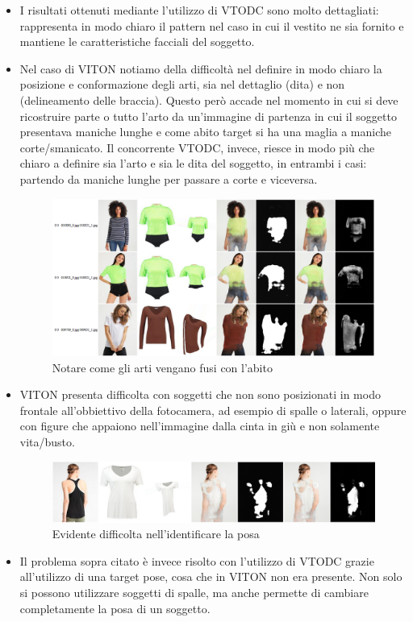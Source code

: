 \documentclass[final, 11pt]{article}
\begin{document}
	\begin{itemize}
		\item I risultati ottenuti mediante l'utilizzo di VTODC sono molto dettagliati: rappresenta in modo chiaro il pattern nel caso in cui il vestito ne sia fornito e mantiene le caratteristiche facciali del soggetto.
		\item 	Nel caso di VITON notiamo della difficoltà nel definire in modo chiaro la posizione e conformazione degli arti, sia nel dettaglio (dita) e non (delineamento delle braccia). Questo però accade nel momento in cui si deve ricostruire parte o tutto l’arto da un’immagine di partenza in cui il soggetto presentava maniche lunghe e come abito target si ha una maglia a maniche corte/smanicato.
		Il concorrente VTODC, invece, riesce in modo più che chiaro a definire sia l’arto e sia le dita del soggetto, in entrambi i casi: partendo da maniche lunghe per passare a corte e viceversa.
		\begin{figure}[!htb]
			\centering
			\includegraphics[width=\linewidth]{viton_err_2.png}
			\caption{Notare come gli arti vengano fusi con l'abito}
		\end{figure} 
		\item	VITON presenta difficolta con soggetti che non sono posizionati in modo frontale all’obbiettivo della fotocamera, ad esempio di spalle o laterali, oppure con figure che appaiono nell’immagine dalla cinta in giù e non solamente vita/busto. 
		
		\begin{figure}[!htb]
			\centering
			\includegraphics[width=\linewidth]{spalleviton.png}
			\caption{Evidente difficolta nell'identificare la posa}
		\end{figure} 
		\item	Il problema sopra citato è invece risolto con l’utilizzo di VTODC grazie all’utilizzo di una target pose, cosa che in VITON non era presente.
		Non solo si possono utilizzare soggetti di spalle, ma anche permette di cambiare completamente la posa di un soggetto.
		

\end{itemize}
\end{document}
